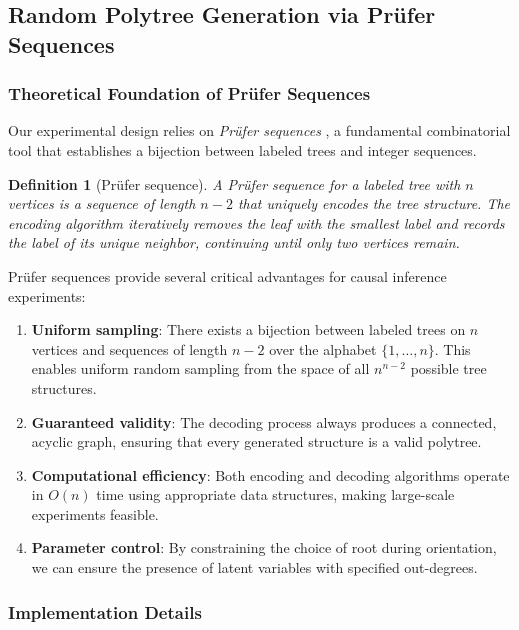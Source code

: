 \documentclass[11pt,a4paper]{article}
\numberwithin{equation}{section}
\newtheorem{definition}[theorem]{Definition}
\begin{document}
\subsection{Random Polytree Generation via Prüfer Sequences}

\subsubsection{Theoretical Foundation of Prüfer Sequences}

Our experimental design relies on \emph{Prüfer sequences} \citep{prufer}, a fundamental combinatorial tool that establishes a bijection between labeled trees and integer sequences.

\begin{definition}[Prüfer sequence]
A Prüfer sequence for a labeled tree with $n$ vertices is a sequence of length $n-2$ that uniquely encodes the tree structure. The encoding algorithm iteratively removes the leaf with the smallest label and records the label of its unique neighbor, continuing until only two vertices remain.
\end{definition}

Prüfer sequences provide several critical advantages for causal inference experiments:

\begin{enumerate}[label=(\roman*)]
\item \textbf{Uniform sampling}: There exists a bijection between labeled trees on $n$ vertices and sequences of length $n-2$ over the alphabet $\{1,\ldots,n\}$. This enables uniform random sampling from the space of all $n^{n-2}$ possible tree structures.

\item \textbf{Guaranteed validity}: The decoding process always produces a connected, acyclic graph, ensuring that every generated structure is a valid polytree.

\item \textbf{Computational efficiency}: Both encoding and decoding algorithms operate in $O(n)$ time using appropriate data structures, making large-scale experiments feasible.

\item \textbf{Parameter control}: By constraining the choice of root during orientation, we can ensure the presence of latent variables with specified out-degrees.
\end{enumerate}

\subsubsection{Implementation Details}
\end{document}
